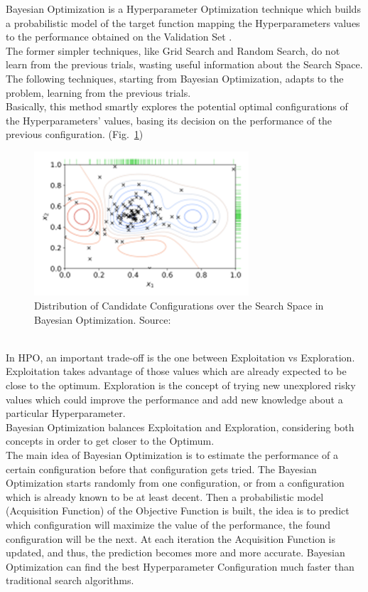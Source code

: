 Bayesian Optimization is a Hyperparameter Optimization technique which builds a probabilistic model of the target function mapping the Hyperparameters values to the performance obtained on the Validation Set \cite{OptunaSamplers-TreeStructuredParzenEstimator}.
\\[0.3cm]The former simpler techniques, like Grid Search and Random Search, do not learn from the previous trials, wasting useful information about the Search Space. The following techniques, starting from Bayesian Optimization, adapts to the problem, learning from the previous trials. 
\\[0.3cm]Basically, this method smartly explores the potential optimal configurations of the Hyperparameters' values, basing its decision on the performance of the previous configuration. (Fig.~\ref{fig:figure-2.2.6})
\begin{figure}[t]
	\centering
	\includegraphics[width=8cm]{figures/figure-2.2.6.png}
	\caption[Candidates Distribution in Bayesian Optimization]{Distribution of Candidate Configurations over the Search Space in Bayesian Optimization. Source:~\cite{Tesi-1.1}}
	\label{fig:figure-2.2.6}
\end{figure}
% 
\\[0.3cm]In HPO, an important trade-off is the one between Exploitation vs Exploration.
Exploitation takes advantage of those values which are already expected to be close to the optimum.
Exploration is the concept of trying new unexplored risky values which could improve the performance and add new knowledge about a particular Hyperparameter.
\\[0.3cm]Bayesian Optimization balances Exploitation and Exploration, considering both concepts in order to get closer to the Optimum.
% 
\\[0.3cm]The main idea of Bayesian Optimization is to estimate the performance of a certain configuration before that configuration gets tried.
The Bayesian Optimization starts randomly from one configuration, or from a configuration which is already known to be at least decent.
Then a probabilistic model (Acquisition Function) of the Objective Function is built, the idea is to predict which configuration will maximize the value of the performance, the found configuration will be the next.
At each iteration the Acquisition Function is updated, and thus, the prediction becomes more and more accurate.
Bayesian Optimization can find the best Hyperparameter Configuration much faster than traditional search algorithms.

